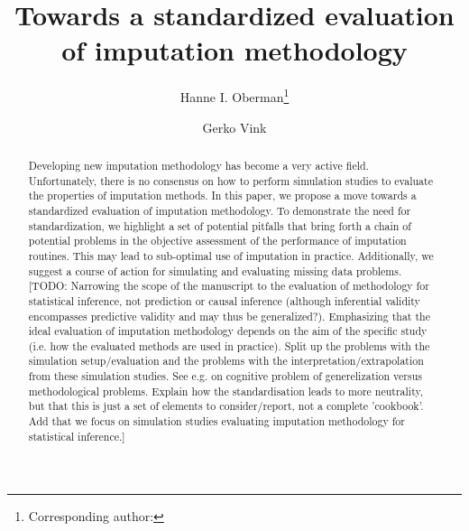 \documentclass[bimj,fleqn]{w-art}
\begin{document}
\keywords{Evaluation; Imputation; Missing data; Simulation studies;\\ [1pc]
\noindent \hspace*{-4pc} Supporting Information for this article is available from \underline{www.gerkovink.com/evaluation}.\\
}  %

\title[Towards a standardized evaluation of imputation methodology]{Towards a standardized evaluation of imputation methodology}
\author[Oberman]{Hanne I. Oberman\footnote{Corresponding author: {}}} 
\address[\inst{1}]{Departement of Methodology \& Statistics, Padualaan 14, 3584 CH Utrecht, The Netherlands}
\author[Vink]{Gerko Vink}
   

\begin{abstract}
Developing new imputation methodology has become a very active field. Unfortunately, there is no consensus on how to perform simulation studies to evaluate the properties of imputation methods. In this paper, we propose a move towards a standardized evaluation of imputation methodology. To demonstrate the need for standardization, we highlight a set of potential pitfalls that bring forth a chain of potential problems in the objective assessment of the performance of imputation routines. This may lead to sub-optimal use of  imputation in practice. Additionally, we suggest a course of action for simulating and evaluating missing data problems. [TODO: Narrowing the scope of the manuscript to the evaluation of methodology for statistical inference, not prediction or causal inference (although inferential validity encompasses predictive validity and may thus be generalized?). Emphasizing that the ideal evaluation of imputation methodology depends on the aim of the specific study (i.e. how the evaluated methods are used in practice). Split up the problems with the simulation setup/evaluation and the problems with the interpretation/extrapolation from these simulation studies. See e.g. \citet{gree17} on cognitive problem of generelization versus methodological problems. Explain how the standardisation leads to more neutrality, but that this is just a set of elements to consider/report, not a complete 'cookbook'. Add that we focus on  simulation studies evaluating imputation methodology for statistical inference.]
\end{abstract}
\end{document}
